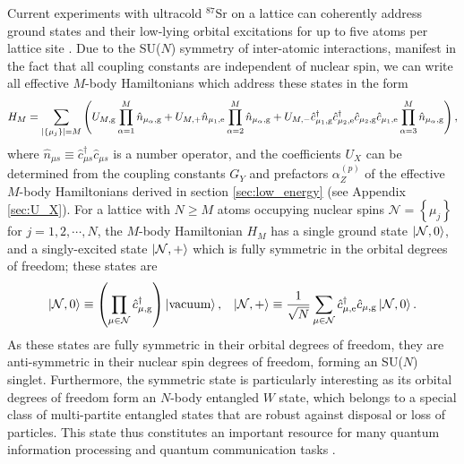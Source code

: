 \documentclass[preprint,showkeys,nofootinbib]{revtex4-1}
\renewcommand{\t}{\text} %
\newcommand{\f}{\dfrac} %
\newcommand{\p}[1]{\left(#1\right)} %
\renewcommand{\set}[1]{\left\{#1\right\}} %
\newcommand{\g}{\text{g}}
\newcommand{\e}{\text{e}}
\renewcommand{\c}{\hat{c}}
\newcommand{\n}{\hat{n}}
\newcommand{\N}{\mathcal{N}}
\newcommand{\1}{\mathds{1}}
\begin{document}
Current experiments with ultracold ${}^{87}$Sr on a lattice can
coherently address ground states and their low-lying orbital
excitations for up to five atoms per lattice site
\cite{goban2018emergence}.  Due to the SU($N$) symmetry of
inter-atomic interactions, manifest in the fact that all coupling
constants are independent of nuclear spin, we can write all effective
$M$-body Hamiltonians which address these states in the form
\begin{align}
  H_M = \sum_{\abs{\set{\mu_j}}=M}
  \p{U_{M,\g} \prod_{\alpha=1}^M \n_{\mu_\alpha,\g}
    + U_{M,+} \n_{\mu_1,\e} \prod_{\alpha=2}^M \n_{\mu_\alpha,\g}
    + U_{M,-} \c_{\mu_1,\g}^\dag \c_{\mu_2,\e}^\dag
    \c_{\mu_2,\g} \c_{\mu_1,\e} \prod_{\alpha=3}^M \n_{\mu_\alpha,\g}},
  \label{eq:H_M}
\end{align}
where $\n_{\mu s}\equiv \c_{\mu s}^\dag\c_{\mu s}$ is a number
operator, and the coefficients $U_X$ can be determined from the
coupling constants $G_Y$ and prefactors $\alpha_Z^{(p)}$ of the
effective $M$-body Hamiltonians derived in section
\ref{sec:low_energy} (see Appendix \ref{sec:U_X}).  For a lattice with
$N\ge M$ atoms occupying nuclear spins $\N=\set{\mu_j}$ for
$j=1,2,\cdots,N$, the $M$-body Hamiltonian $H_M$ has a single ground
state $\ket{\N,0}$, and a singly-excited state $\ket{\N,+}$ which is
fully symmetric in the orbital degrees of freedom; these states are
\begin{align}
  \ket{\N,0}
  \equiv \p{\prod_{\mu\in\N} \c_{\mu,\g}^\dag} \ket{\t{vacuum}},
  &&
  \ket{\N,+} \equiv \f1{\sqrt{N}} \sum_{\mu\in\N}
  \c_{\mu,\e}^\dag \c_{\mu,\g} \ket{\N,0}.
  \label{eq:states_S}
\end{align}
As these states are fully symmetric in their orbital degrees of
freedom, they are anti-symmetric in their nuclear spin degrees of
freedom, forming an SU($N$) singlet.  Furthermore, the symmetric state
is particularly interesting as its orbital degrees of freedom form an
$N$-body entangled $W$ state, which belongs to a special class of
multi-partite entangled states that are robust against disposal or
loss of particles.  This state thus constitutes an important resource
for many quantum information processing and quantum communication
tasks \cite{zang2015generating}.
\end{document}
